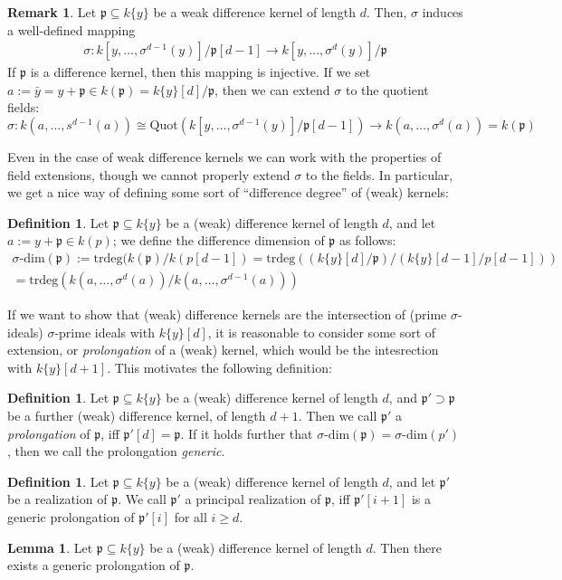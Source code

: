 \documentclass{article}
\def\p{\mathfrak{p}}
\def\s{\sigma}
\def\sdim{\sigma\text{-dim}}
\theoremstyle{definition}
\newtheorem{rem}[Satz]{Remark}
\newtheorem{defn}[Satz]{Definition}
\newtheorem{lem}[Satz]{Lemma}
\begin{document}
\begin{rem}
Let $\p \subseteq k\{y\}$ be a weak difference kernel of length $d$. Then, $\s$ induces a well-defined mapping 
\begin{align*}
\s: k[y,\ldots,\s^{d-1}(y)]/\p[d-1] \rightarrow k[y,\ldots,\s^{d}(y)]/\p
\end{align*}
If $\p$ is a difference kernel, then this mapping is injective. 
If we set $a := \bar y = y + \p \in k(\p) = k\{y\}[d]/\p$, then we can extend $\s$ to the quotient fields:
\[ \s: k(a,\ldots,s^{d-1}(a)) \cong \text{Quot}(k[y,\ldots,\s^{d-1}(y)]/\p[d-1]) \rightarrow k(a,\ldots,\s^d(a)) = k(\p) \]
\end{rem}

Even in the case of weak difference kernels we can work with the properties of field extensions, though we cannot properly extend $\s$ to the fields.
 In particular, we get a nice way of defining some sort of ``difference degree'' of (weak) kernels:
\begin{defn}
Let $\p \subseteq k\{y\}$ be a (weak) difference kernel of length $d$, and let $a:= y + \p \in k(p)$; we define the difference dimension of $\p$ as follows:
\begin{align*} \sdim(\p) := \text{trdeg}(k(\p)/k(p[d-1]) = \text{trdeg}((k\{y\}[d]/\p)/(k\{y\}[d-1]/p[d-1])) \\  = \text{trdeg}(k(a,\ldots,\s^{d}(a))/k(a,\ldots,\s^{d-1}(a))) \end{align*}
\end{defn}\index{$\s$-dimension of a $\s$-kernel}

If we want to show that (weak) difference kernels are the intersection of (prime $\s$-ideals) $\s$-prime ideals with $k\{y\}[d]$,
it is reasonable to consider some sort of extension, or \emph{prolongation} of a (weak) kernel, which would be the intesrection with $k\{y\}[d+1]$. 
This motivates the following definition:

\begin{defn}
Let $\p \subseteq k\{y\}$ be a (weak) difference kernel of length $d$, and $\p' \supset \p$ be a further (weak) difference kernel, of length $d+1$.
Then we call $\p'$ a \emph{prolongation} of $\p$, iff $\p'[d] = \p$. If it holds further that $\sdim(\p) = \sdim(p')$, then we call the prolongation \emph{generic}.
\end{defn}

\begin{defn}
Let $\p \subseteq k\{y\}$ be a (weak) difference kernel of length $d$, and let $\p'$ be a realization of $\p$. We call $\p'$ a principal realization of $\p$, iff $\p'[i+1]$ is a generic prolongation of $\p'[i]$ for all $i \geq d$.
\end{defn}

\begin{lem}
Let $\p \subseteq k\{y\}$ be a (weak) difference kernel of length $d$. Then there exists a generic prolongation of $\p$. 
\end{lem}
\end{document}
